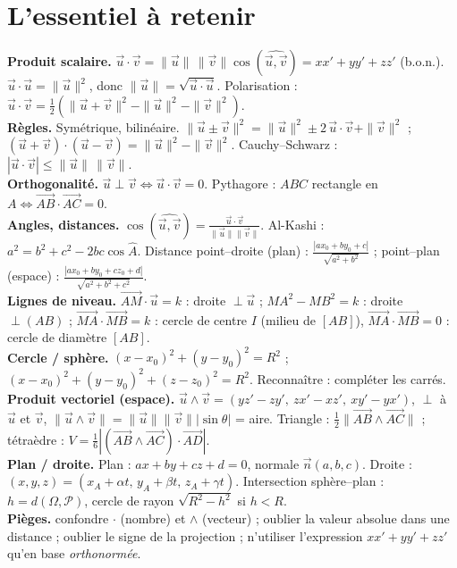\section{L'essentiel à retenir}

\begin{synthese}
\textbf{Produit scalaire.}
$\vec u\cdot\vec v=\|\vec u\|\,\|\vec v\|\cos(\widehat{\vec u,\vec v})=xx'+yy'+zz'$
(b.o.n.). $\vec u\cdot\vec u=\|\vec u\|^{2}$, donc $\|\vec u\|=\sqrt{\vec u\cdot\vec u}$.
Polarisation : $\vec u\cdot\vec v=\tfrac12(\|\vec u+\vec v\|^{2}-\|\vec u\|^{2}-\|\vec v\|^{2})$.\\[4pt]
\textbf{Règles.} Symétrique, bilinéaire.
$\|\vec u\pm\vec v\|^{2}=\|\vec u\|^{2}\pm2\,\vec u\cdot\vec v+\|\vec v\|^{2}$ ;\
$(\vec u+\vec v)\cdot(\vec u-\vec v)=\|\vec u\|^{2}-\|\vec v\|^{2}$.
Cauchy--Schwarz : $|\vec u\cdot\vec v|\le\|\vec u\|\,\|\vec v\|$.\\[4pt]
\textbf{Orthogonalité.} $\vec u\perp\vec v\iff\vec u\cdot\vec v=0$. Pythagore :
$ABC$ rectangle en $A\iff\overrightarrow{AB}\cdot\overrightarrow{AC}=0$.\\[4pt]
\textbf{Angles, distances.} $\cos(\widehat{\vec u,\vec v})=\frac{\vec u\cdot\vec v}{\|\vec u\|\|\vec v\|}$.
Al-Kashi : $a^{2}=b^{2}+c^{2}-2bc\cos\widehat A$.
Distance point–droite (plan) : $\frac{|ax_0+by_0+c|}{\sqrt{a^{2}+b^{2}}}$ ;
point–plan (espace) : $\frac{|ax_0+by_0+cz_0+d|}{\sqrt{a^{2}+b^{2}+c^{2}}}$.\\[4pt]
\textbf{Lignes de niveau.} $\overrightarrow{AM}\cdot\vec u=k$ : droite $\perp\vec u$ ;
$MA^{2}-MB^{2}=k$ : droite $\perp(AB)$ ;
$\overrightarrow{MA}\cdot\overrightarrow{MB}=k$ : cercle de centre $I$ (milieu de $[AB]$),
$\overrightarrow{MA}\cdot\overrightarrow{MB}=0$ : cercle de diamètre $[AB]$.\\[4pt]
\textbf{Cercle / sphère.} $(x-x_0)^{2}+(y-y_0)^{2}=R^{2}$ ;
$(x-x_0)^{2}+(y-y_0)^{2}+(z-z_0)^{2}=R^{2}$. Reconnaître : compléter les carrés.\\[4pt]
\textbf{Produit vectoriel (espace).} $\vec u\wedge\vec v=(yz'-zy',\ zx'-xz',\ xy'-yx')$,
$\perp$ à $\vec u$ et $\vec v$, $\|\vec u\wedge\vec v\|=\|\vec u\|\|\vec v\||\sin\theta|$ = aire.
Triangle : $\tfrac12\|\overrightarrow{AB}\wedge\overrightarrow{AC}\|$ ;
tétraèdre : $V=\tfrac16|(\overrightarrow{AB}\wedge\overrightarrow{AC})\cdot\overrightarrow{AD}|$.\\[4pt]
\textbf{Plan / droite.} Plan : $ax+by+cz+d=0$, normale $\vec n(a,b,c)$.
Droite : $(x,y,z)=(x_A+\alpha t,\,y_A+\beta t,\,z_A+\gamma t)$.
Intersection sphère–plan : $h=d(\Omega,\mathcal P)$, cercle de rayon $\sqrt{R^{2}-h^{2}}$ si $h<R$.\\[4pt]
\textbf{Pièges.} confondre $\cdot$ (nombre) et $\wedge$ (vecteur) ; oublier la valeur absolue
dans une distance ; oublier le signe de la projection ; n'utiliser l'expression
$xx'+yy'+zz'$ qu'en base \emph{orthonormée}.
\end{synthese}

